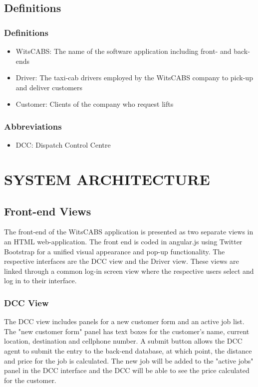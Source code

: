 \documentclass[10pt, onecolumn]{witseiepaper}
\begin{document}
\subsection{Definitions}
\subsubsection{Definitions}
\begin{itemize}
\item WitsCABS: The name of the software application including front- and back-ends
\item Driver: The taxi-cab drivers employed by the WitsCABS company to pick-up and deliver customers
\item Customer: Clients of the company who request lifts
\end{itemize}
\subsubsection{Abbreviations}
\begin{itemize}
\item DCC: Dispatch Control Centre
\end{itemize}


\section{SYSTEM ARCHITECTURE}
\subsection{Front-end Views}
The front-end of the WitsCABS application is presented as two separate views in an HTML web-application. The front end is coded in angular.js using Twitter Bootstrap for a unified visual appearance and pop-up functionality. The respective interfaces are the DCC view and the Driver view. These views are linked through a common log-in screen view where the respective users select and log in to their interface.
\subsubsection{DCC View}
The DCC view includes panels for a new customer form and an active job list. The "new customer form" panel has text boxes for the customer's name, current location, destination and cellphone number. A submit button allows the DCC agent to submit the entry to the back-end database, at which point, the distance and price for the job is calculated. The new job will be added to the "active jobs" panel in the DCC interface and the DCC will be able to see the price calculated for the customer.
\end{document}
